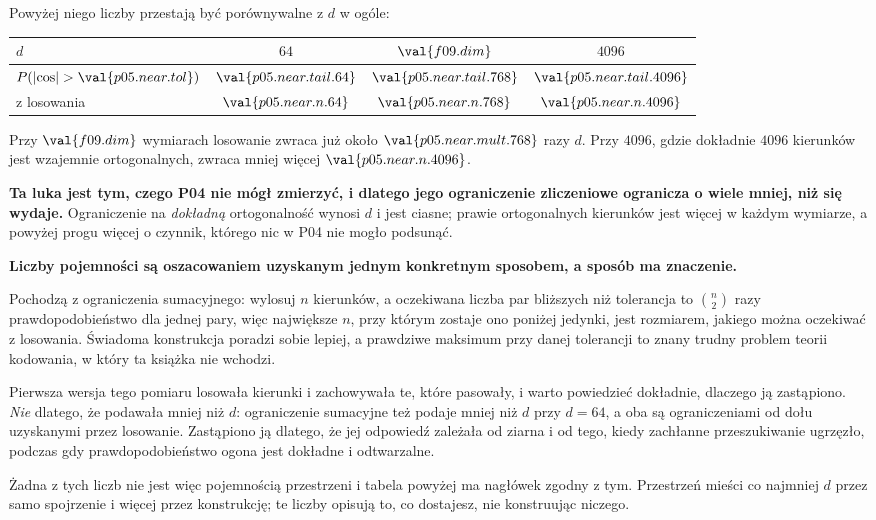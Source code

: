\begin{fr}
Powyżej niego liczby przestają być porównywalne z $d$ w ogóle:

\begin{center}
\begin{tabular}{lccc}
\toprule
$d$ & $64$ & $\val{f09.dim}$ & $4096$ \\
\midrule
$P(\lvert\cos\rvert > \val{p05.near.tol})$ & $\val{p05.near.tail.64}$ &
  $\val{p05.near.tail.768}$ & $\val{p05.near.tail.4096}$ \\
z losowania & $\val{p05.near.n.64}$ & $\val{p05.near.n.768}$ &
  $\val{p05.near.n.4096}$ \\
\bottomrule
\end{tabular}
\end{center}

Przy $\val{f09.dim}$ wymiarach losowanie zwraca już około
$\val{p05.near.mult.768}$ razy $d$. Przy $4096$, gdzie dokładnie $4096$
kierunków jest wzajemnie ortogonalnych, zwraca mniej więcej
$\val{p05.near.n.4096}$.

\textbf{Ta luka jest tym, czego P04 nie mógł zmierzyć, i dlatego jego
ograniczenie zliczeniowe ogranicza o wiele mniej, niż się wydaje.}
Ograniczenie na \emph{dokładną} ortogonalność wynosi $d$ i jest ciasne; prawie
ortogonalnych kierunków jest więcej w każdym wymiarze, a powyżej progu więcej o
czynnik, którego nic w P04 nie mogło podsunąć.
\end{fr}

\begin{fr}
\begin{rigourbox}
\textbf{Liczby pojemności są oszacowaniem uzyskanym jednym konkretnym
sposobem, a sposób ma znaczenie.}

Pochodzą z ograniczenia sumacyjnego: wylosuj $n$ kierunków, a oczekiwana liczba
par bliższych niż tolerancja to $\binom{n}{2}$ razy prawdopodobieństwo dla
jednej pary, więc największe $n$, przy którym zostaje ono poniżej jedynki, jest
rozmiarem, jakiego można oczekiwać z losowania. Świadoma konstrukcja poradzi
sobie lepiej, a prawdziwe maksimum przy danej tolerancji to znany trudny
problem teorii kodowania, w który ta książka nie wchodzi.

Pierwsza wersja tego pomiaru losowała kierunki i zachowywała te, które
pasowały, i warto powiedzieć dokładnie, dlaczego ją zastąpiono. \emph{Nie}
dlatego, że podawała mniej niż $d$: ograniczenie sumacyjne też podaje mniej niż
$d$ przy $d = 64$, a oba są ograniczeniami od dołu uzyskanymi przez losowanie.
Zastąpiono ją dlatego, że jej odpowiedź zależała od ziarna i od tego, kiedy
zachłanne przeszukiwanie ugrzęzło, podczas gdy prawdopodobieństwo ogona jest
dokładne i odtwarzalne.

Żadna z tych liczb nie jest więc pojemnością przestrzeni i tabela powyżej ma
nagłówek zgodny z tym. Przestrzeń mieści co najmniej $d$ przez samo spojrzenie
i więcej przez konstrukcję; te liczby opisują to, co dostajesz, nie konstruując
niczego.
\end{rigourbox}
\end{fr}

